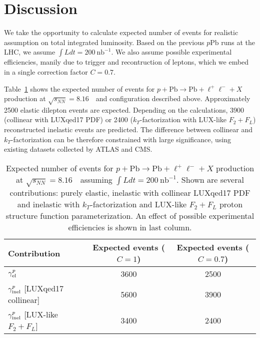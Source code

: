 \clearpage
\section{Discussion}

We take the opportunity to calculate expected number of events for realistic assumption on total integrated luminosity.
Based on the previous $p\textrm{Pb}$ runs at the LHC, we assume  $\int Ldt= 200~\textrm{nb}^{-1}$.
We also assume possible experimental efficiencies, manily due to trigger and recontruction of leptons, which we embed in a single correction factor $C=0.7$.

Table~\ref{fig:numbers} shows the expected number of events for $p+\textrm{Pb}\rightarrow \textrm{Pb} + \ell^+\ell^- + X$ production at $\sqrt{s_{N N}} = 8.16$~\TeV\ and configuration described above. 
Approximately 2500 elastic dilepton events are expected. 
Depending on the calculations, 3900 (collinear with LUXqed17 PDF) or 2400 ($k_T$-factorization with LUX-like $F_2+F_L$) reconstructed inelastic events are predicted. The difference between collinear and $k_T$-factorization can be therefore constrained with large significance, using existing datasets collected by ATLAS and CMS.

\begin{table}[t]
\begin{center}
\begin{tabular}{|l|c|c|}
\hline
Contribution & Expected events ($C=1$) & Expected events ($C=0.7$) \\
\hline
$\gamma^{p}_{\rm{el}}$  & 3600 & 2500\\ %
\hline
$\gamma^{p}_{\rm{inel}}$ [LUXqed17 collinear] & 5600 & 3900 \\
\hline
$\gamma^{p}_{\rm{inel}}$ [LUX-like $F_2+F_L$] & 3400 & 2400 \\
\hline
\end{tabular}
\end{center}
\caption{Expected number of events for $p+\textrm{Pb}\rightarrow \textrm{Pb} + \ell^+\ell^- + X$ production at $\sqrt{s_{N N}} = 8.16$~\TeV\ assuming $\int Ldt= 200~\textrm{nb}^{-1}$. 
Shown are several contributions: purely elastic, inelastic with collinear LUXqed17 PDF and inelastic with $k_T$-factorization and LUX-like $F_2+F_L$ proton structure function parameterization.
An effect of possible experimental efficiencies is shown in last column.}
\label{fig:numbers}
\end{table}
